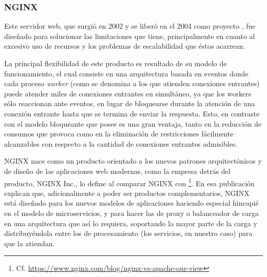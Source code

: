 \subsubsection{NGINX}
\label{soa:tecnologias:nginx}

Este servidor web, que surgió en 2002 y se liberó en el 2004 como proyecto , fue diseñado para solucionar las limitaciones que  tiene, principalmente en cuanto al excesivo uso de recursos y los problemas de escalabilidad que éstos acarrean.

La principal flexibilidad de este producto es resultado de su modelo de funcionamiento, el cual consiste en una arquitectura basada en eventos donde cada proceso \textit{worker} (como se denomina a los que atienden conexiones entrantes) puede atender miles de conexiones entrantes en simultáneo, ya que los workers sólo reaccionan ante eventos, en lugar de bloquearse durante la atención de una conexión entrante hasta que se termina de enviar la respuesta. Esto, en contraste con el modelo bloqueante que  posee es una gran ventaja, tanto en la reducción de consumos que provoca como en la eliminación de restricciones fácilmente alcanzables con respecto a la cantidad de conexiones entrantes admisibles.

NGINX nace como un producto orientado a los nuevos patrones arquitectónicos y de diseño de las aplicaciones web modernas, como la empresa detrás del producto, NGINX Inc., lo define al comparar NGINX con \footnote{Cf. \url{https://www.nginx.com/blog/nginx-vs-apache-our-view}}. En esa publicación explican que, adicionalmente a poder ser productos complementarios, NGINX está diseñado para los nuevos modelos de aplicaciones haciendo especial hincapié en el modelo de microservicios, y para hacer las de proxy o balanceador de carga en una arquitectura que así lo requiera, soportando la mayor parte de la carga y distribuyéndola entre los  de procesamiento (los servicios, en nuestro caso) para que la atiendan.
